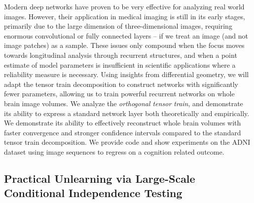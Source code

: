 Modern deep networks have proven to be very effective for analyzing real world images.
However, their application in medical imaging is still in its early stages,
primarily due to the large dimension of three-dimensional images, requiring enormous convolutional or fully connected layers --
if we treat an image (and not image patches) as a sample. 
These issues only compound when the focus moves towards longitudinal analysis
through recurrent structures, and when a point estimate of model parameters is insufficient 
in scientific applications where a reliability measure is necessary.
Using insights from differential geometry, 
we will adapt 
the tensor train decomposition to construct networks
with significantly fewer parameters,
allowing us to train powerful recurrent networks on whole brain image volumes. 
We analyze 
the \textit{orthogonal tensor train},
and demonstrate its ability to express a standard network layer both theoretically and empirically.
We 
demonstrate its ability to 
effectively reconstruct whole brain volumes
with faster convergence and stronger confidence intervals
compared to the standard tensor train decomposition. 
We provide code and show experiments on the ADNI dataset
using image sequences to regress on a cognition related outcome.

\subsection{Practical Unlearning via Large-Scale Conditional Independence Testing}

